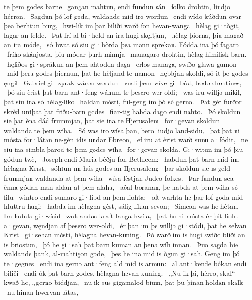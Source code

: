 te þem godes barne \hld\ gangan mahtun,
endi fundun sán \hld\ folko drohtin,
liudjo hérron. \hld\ Sagdun þó lof goda,
waldande mid iro wordun \hld\ endi wído kúðdun
ovar þea berhtun burg, \hld\ hwi-lik im þar biliði warð
fon hevan-wanga \hld\ hèlag gi·tògit,
fagar an felde. \hld\ Þat frí al bi·held
an ira hugi-skęftjun, \hld\ hèlag þiorna,
þiu magað an ira móde, \hld\ só hwat só siu gi·hòrda þea mann sprekan.
Fódda ina þó fagaro \hld\ frího skánjosta,
þiu módar þurh minnja \hld\ managaro drohtin,
hèlag himilisk barn. \hld\ hęliðos gi·sprákun
an þem ahtodon daga \hld\ erlos managa,
swíðo glawa gumon \hld\ mid þera godes þiornun,
þat he hèljand te namon \hld\ hębbjan skoldi,
só it þe godes ęngil \hld\ Gabriel gi·sprak
wáron wordun \hld\ endi þem wíve gi·bòd,
bodo drohtines, \hld\ þó siu èrist þat barn ant·feng
wánum te þesero wer-oldi; \hld\ was iru willjo mikil,
þat siu ina só hèlag-líko \hld\ haldan mósti,
ful-geng im þó só gerno. \hld\ Þat gér furðor skrèd
untþat þat friðu-barn godes \hld\ fiar-tig habda
dago endi nahto. \hld\ Þó skoldun sie þar èna dád frummjan,
þat sie ina te Hjerusalem \hld\ for·gevan skoldun
waldanda te þem wíha. \hld\ Só was iro wísa þan,
þero liudjo land-sidu, \hld\ þat þat ni mósta for·látan ne-gèn
idis undar Ebreon, \hld\ ef iru at èrist warð
sunu a·fódit, \hld\ ne siu ina simbla þarod
te þem godes wíha \hld\ for·gevan skolda.
Gi·witun im þó þiu gódun twè, \hld\ Joseph endi Maria
bèðju fon Bethleem: \hld\ habdun þat barn mid im,
hèlagna Krist, \hld\ sóhtun im hús godes
an Hjerusalem; \hld\ þar skoldun sie is geld frummjan
waldanda at þem wíha \hld\ wísa léstjan
Judeo folkes. \hld\ Þar fundun sea ènna gódan man
aldan at þem alaha, \hld\ aðal-boranan,
þe habda at þem wíha só filu \hld\ wintro endi sumaro
gi·libd an þem liohta: \hld\ oft warhta he þar lof goda
mid hluttru hugi; \hld\ habda im hèlagna gèst,
sálig-líkan sevon; \hld\ Simeon was he hètan.
Im habda gi·wísid \hld\ waldandas kraft
langa hwíla, \hld\ þat he ni mósta ér þit lioht a·gevan,
węndjan af þesero wer-oldi, \hld\ ér þan im þe willjo gi·stódi,
þat he selvan Krist \hld\ gi·sehan mósti,
hèlagna hevan-kuning. \hld\ Þó warð im is hugi swíðo
blíði an is briostun, \hld\ þó he gi·sah þat barn kuman
an þena wíh innan. \hld\ Þuo sagda hie waldande þank,
al-mahtigon gode, \hld\ þes he ina mid is ògun gi·sah.
Geng im þó te·gegnes \hld\ endi ina gerno ant·feng
ald mid is armun: \hld\ al ant·kende
bókan endi biliði \hld\ endi ók þat barn godes,
hèlagna hevan-kuning. \hld\ „Nu ik þi, hérro, skal“, kwað he,
„gerno biddjan, \hld\ nu ik sus gigamalod bium,
þat þu þínan holdan skalk \hld\ nu hinan hwervan látas,
